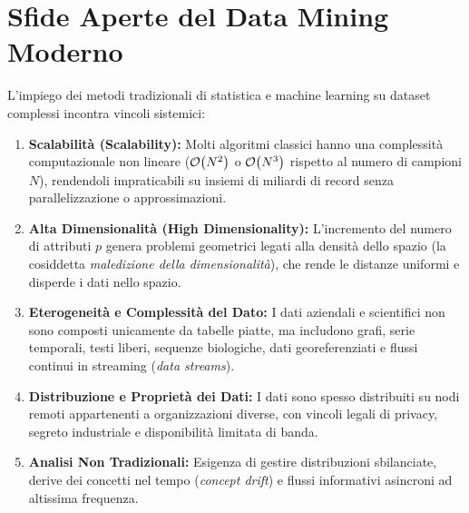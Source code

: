 \FloatBarrier
\section{Sfide Aperte del Data Mining Moderno}

L'impiego dei metodi tradizionali di statistica e machine learning su dataset complessi incontra vincoli sistemici:

\begin{enumerate}
    \item \textbf{Scalabilit\`a (Scalability):} Molti algoritmi classici hanno una complessit\`a computazionale non lineare ($\mathcal{O}\!\left(N^2\right)$ o $\mathcal{O}\!\left(N^3\right)$ rispetto al numero di campioni $N$), rendendoli impraticabili su insiemi di miliardi di record senza parallelizzazione o approssimazioni.
    \item \textbf{Alta Dimensionalit\`a (High Dimensionality):} L'incremento del numero di attributi $p$ genera problemi geometrici legati alla densit\`a dello spazio (la cosiddetta \textit{maledizione della dimensionalit\`a}), che rende le distanze uniformi e disperde i dati nello spazio.
    \item \textbf{Eterogeneit\`a e Complessit\`a del Dato:} I dati aziendali e scientifici non sono composti unicamente da tabelle piatte, ma includono grafi, serie temporali, testi liberi, sequenze biologiche, dati georeferenziati e flussi continui in streaming (\textit{data streams}).
    \item \textbf{Distribuzione e Propriet\`a dei Dati:} I dati sono spesso distribuiti su nodi remoti appartenenti a organizzazioni diverse, con vincoli legali di privacy, segreto industriale e disponibilit\`a limitata di banda.
    \item \textbf{Analisi Non Tradizionali:} Esigenza di gestire distribuzioni sbilanciate, derive dei concetti nel tempo (\textit{concept drift}) e flussi informativi asincroni ad altissima frequenza.
\end{enumerate}
